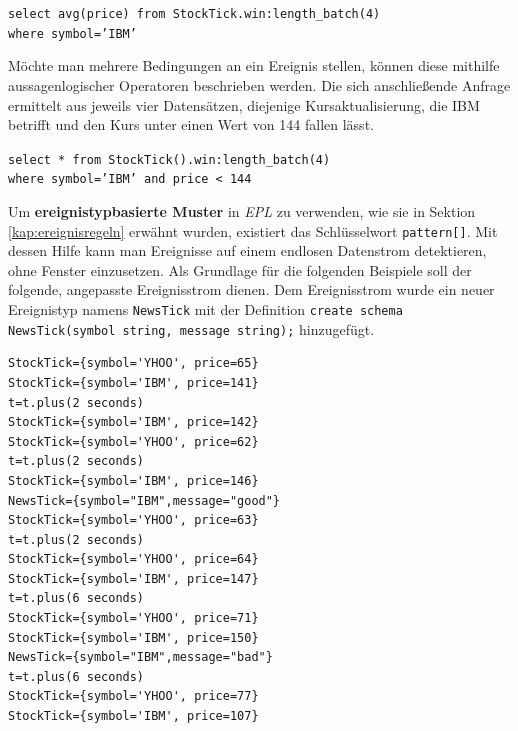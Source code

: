 \documentclass{acm_proc_article-sp}
\begin{document}
\texttt{select  avg(price) from StockTick.win:length\_batch(4)\\where symbol='IBM'}
\begin{table}[ht]
    \caption{\texttt{batch}-Längenfenster}
    \label{table:warteschlange-batch}\vspace{0.2cm}
\end{table}

Möchte man mehrere Bedingungen an ein Ereignis stellen, können diese mithilfe 
aussagenlogischer Operatoren beschrieben werden. Die sich anschließende Anfrage ermittelt 
aus jeweils vier Datensätzen, diejenige Kursaktualisierung, die IBM betrifft und den Kurs 
unter einen Wert von 144 fallen lässt.

\texttt{select * from StockTick().win:length\_batch(4)\\where symbol='IBM' and 
price < 144}

Um \textbf{ereignistypbasierte Muster} in \textit{EPL} zu verwenden, wie sie in Sektion 
\ref{kap:ereignisregeln} erwähnt wurden, existiert das Schlüsselwort \texttt{pattern[]}. 
Mit dessen Hilfe kann man Ereignisse auf einem endlosen Datenstrom detektieren, ohne 
Fenster einzusetzen. Als Grundlage für die folgenden Beispiele soll der folgende, 
angepasste Ereignisstrom dienen. Dem Ereignisstrom wurde ein neuer Ereignistyp namens 
\texttt{NewsTick} mit der Definition
\texttt{create schema NewsTick(symbol string, message string);} hinzugefügt.
\begin{verbatim}
StockTick={symbol='YHOO', price=65}
StockTick={symbol='IBM', price=141}
t=t.plus(2 seconds)
StockTick={symbol='IBM', price=142}
StockTick={symbol='YHOO', price=62}
t=t.plus(2 seconds)
StockTick={symbol='IBM', price=146}
NewsTick={symbol="IBM",message="good"}
StockTick={symbol='YHOO', price=63}
t=t.plus(2 seconds)
StockTick={symbol='YHOO', price=64}
StockTick={symbol='IBM', price=147}
t=t.plus(6 seconds)
StockTick={symbol='YHOO', price=71}
StockTick={symbol='IBM', price=150}
NewsTick={symbol="IBM",message="bad"}
t=t.plus(6 seconds)
StockTick={symbol='YHOO', price=77}
StockTick={symbol='IBM', price=107}
\end{verbatim}
\end{document}
